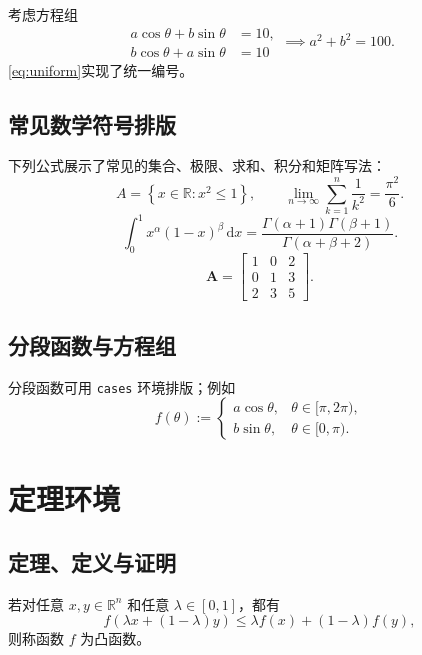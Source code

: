 考虑方程组
\begin{equation}\label{eq:uniform}
\begin{aligned}
  a\cos\theta+b\sin\theta&=10,\\
  b\cos\theta+a\sin\theta&=10
\end{aligned}
  \implies a^2+b^2=100.
\end{equation}
\eqref{eq:uniform}实现了统一编号。
\section{常见数学符号排版}
下列公式展示了常见的集合、极限、求和、积分和矩阵写法：
\begin{equation}
  A=\left\{x\in\mathbb{R}: x^2\le 1\right\}, \qquad
  \lim_{n\to\infty}\sum_{k=1}^{n}\frac{1}{k^2}=\frac{\pi^2}{6}.
\end{equation}
\begin{equation}
  \int_{0}^{1} x^\alpha (1-x)^\beta\,\mathrm{d}x
  = \frac{\Gamma(\alpha+1)\Gamma(\beta+1)}{\Gamma(\alpha+\beta+2)}.
\end{equation}
\begin{equation}
  \mathbf{A}=
  \begin{bmatrix}
    1 & 0 & 2 \\
    0 & 1 & 3 \\
    2 & 3 & 5
  \end{bmatrix}.
\end{equation}

\section{分段函数与方程组}
分段函数可用 \texttt{cases} 环境排版；例如
\[
  f(\theta):=
  \begin{cases}
    a\cos\theta,&\theta\in[\pi,2\pi),\\
    b\sin\theta,&\theta\in[0,\pi).
  \end{cases}
\]
\chapter{定理环境}\label{ch:theorem}

\section{定理、定义与证明}
\begin{defn}\label{def:convex}
若对任意 $x,y\in \mathbb{R}^n$ 和任意 $\lambda\in[0,1]$，都有
\[
f(\lambda x+(1-\lambda)y)\le \lambda f(x)+(1-\lambda)f(y),
\]
则称函数 $f$ 为凸函数。
\end{defn}

